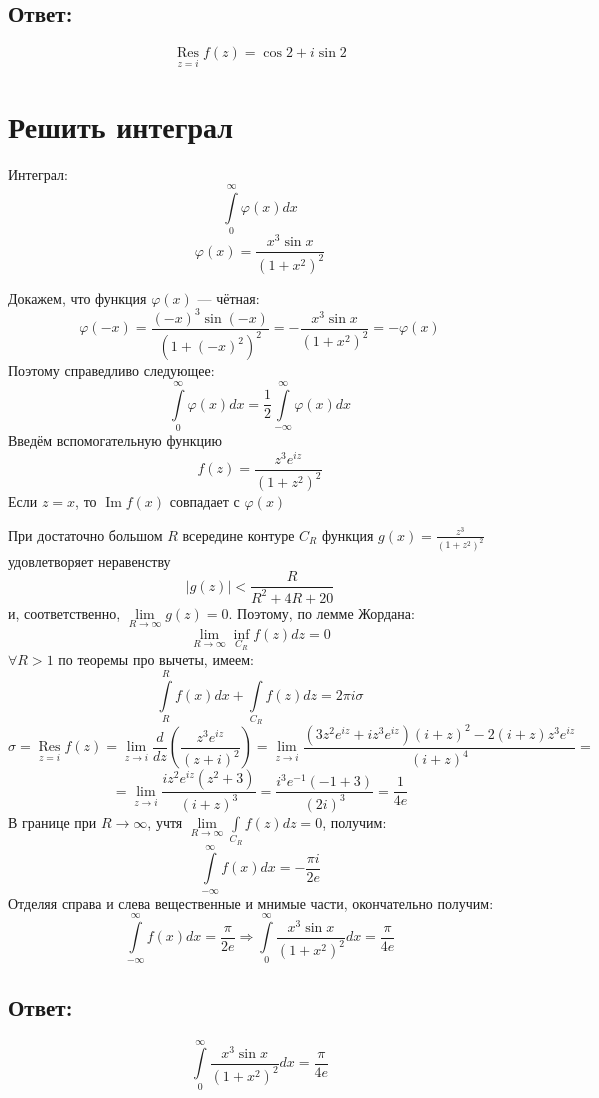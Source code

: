 \documentclass[12pt]{scrartcl}
\begin{document}
\subsection*{Ответ:}
$$\mathop{\text{Res}}\limits_{z=i} f\left(z\right) = \cos2 + i\sin2$$
\newpage
\section{Решить интеграл}
Интеграл:
$$\int\limits_0^\infty \varphi\left(x\right) dx$$
$$\varphi\left(x\right) = \frac{x^3 \sin{x}}{\left(1+x^2\right)^2}$$

Докажем, что функция $\varphi\left(x\right)$ --- чётная:
$$\varphi\left(-x\right) = \frac{\left(-x\right)^3 \sin{\left(-x\right)}}{\left(1+\left(-x\right)^2\right)^2} = -\frac{x^3\sin{x}}{\left(1+x^2\right)^2} = -\varphi\left(x\right)$$
Поэтому справедливо следующее:
$$\int\limits_0^\infty \varphi\left(x\right) dx = \frac12 \int\limits_{-\infty}^\infty \varphi\left(x\right)dx$$
Введём вспомогательную функцию $$f\left(z\right) = \frac{z^3 e^{iz}}{\left(1+z^2\right)^2}$$
Если $z = x$, то $\mathop{\text{Im}}f\left(x\right)$ совпадает с $\varphi\left(x\right)$

При достаточно большом $R$ всередине контуре $C_R$ функция $g\left(x\right) = \frac{z^3}{\left(1+z^2\right)^2}$ удовлетворяет неравенству $$\left|g\left(z\right)\right| < \frac{R}{R^2 + 4R + 20}$$ и, соответственно, $\lim\limits_{R\to\infty}{g\left(z\right)} = 0$. Поэтому, по лемме Жордана:
$$\lim\limits_{R\to\infty}{\inf\limits_{C_R}{f\left(z\right) dz}} = 0$$
$\forall R > 1$ по теоремы про вычеты, имеем:
$$\int\limits_R^R{f\left(x\right) dx} + \int\limits_{C_R}{f\left(z\right)dz} = 2\pi i \sigma$$
$$\sigma = \mathop{\text{Res}}\limits_{z = i}{f\left(z\right)} = \lim\limits_{z\to i}{\frac{d}{dz}\left(\frac{z^3e^{iz}}{\left(z+i\right)^2}\right)} = \lim\limits_{z\to i}{\frac{\left(3z^2 e^{iz}+iz^3e^{iz}\right)\left(i+z\right)^2 - 2\left(i+z\right)z^3e^{iz}}{\left(i+z\right)^4}} =$$
$$=\lim\limits_{z\to i}{\frac{iz^2e^{iz}\left(z^2+3\right)}{\left(i+z\right)^3}} = \frac{i^3e^{-1}\left(-1+3\right)}{\left(2i\right)^3} = \frac{1}{4e}$$
В границе при $R\to\infty$, учтя $\lim\limits_{R\to\infty}\int\limits_{C_R}{f\left(z\right) dz} = 0$, получим:
$$\int\limits_{-\infty}^\infty f\left(x\right) dx = -\frac{\pi i }{2e}$$
Отделяя справа и слева вещественные и мнимые части, окончательно получим:
$$\int\limits_{-\infty}^\infty f(x) dx = \frac{\pi}{2e} \Rightarrow \int\limits_0^\infty \frac{x^3\sin{x}}{(1+x^2)^2}dx = \frac{\pi}{4e}$$
\subsection*{Ответ:}
$$\int\limits_0^\infty \frac{ x^3 \sin{x} }{(1+x^2)^2}dx = \frac{\pi}{4e}$$
\newpage
\end{document}
